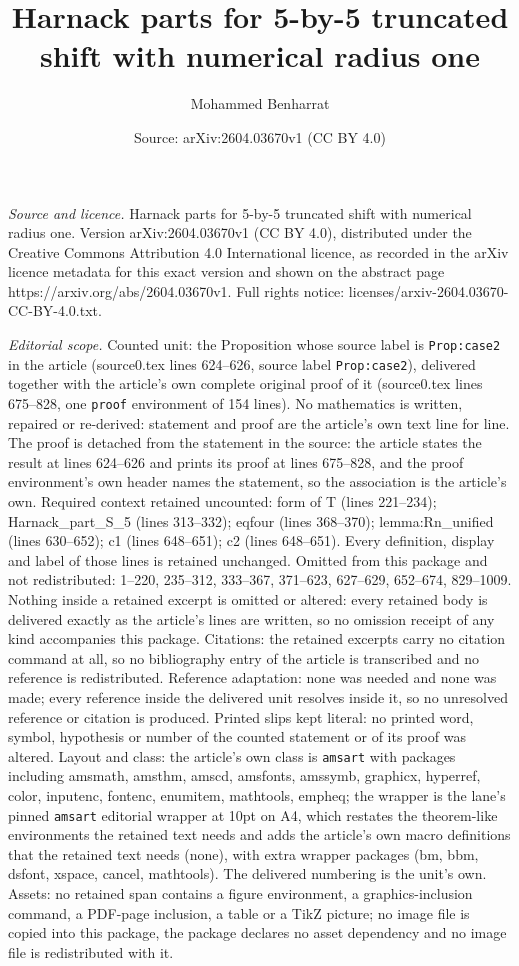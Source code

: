\documentclass[10pt,a4paper]{amsart}
\title[Harnack parts for 5-by-5 truncated shift with numerical radi]{Harnack parts for 5-by-5 truncated shift with numerical radius one}
\author{Mohammed Benharrat}
\date{Source: arXiv:2604.03670v1 (CC BY 4.0)}
\begin{document}
\maketitle

\noindent\emph{Source and licence.} Harnack parts for 5-by-5 truncated shift with numerical radius one. Version arXiv:2604.03670v1 (CC BY 4.0), distributed under the Creative Commons Attribution 4.0 International licence, as recorded in the arXiv licence metadata for this exact version and shown on the abstract page https://arxiv.org/abs/2604.03670v1. Full rights notice: licenses/arxiv-2604.03670-CC-BY-4.0.txt.\par\smallskip

\noindent\textit{Editorial scope.} Counted unit: the Proposition whose source label is \texttt{Prop:case2} in the article (source0.tex lines 624--626, source label \texttt{Prop:case2}), delivered together with the article's own complete original proof of it (source0.tex lines 675--828, one \texttt{proof} environment of 154 lines). No mathematics is written, repaired or re-derived: statement and proof are the article's own text line for line. The proof is detached from the statement in the source: the article states the result at lines 624--626 and prints its proof at lines 675--828, and the proof environment's own header names the statement, so the association is the article's own. Required context retained uncounted: form of T (lines 221--234); Harnack\_part\_S\_5 (lines 313--332); eqfour (lines 368--370); lemma:Rn\_unified (lines 630--652); c1 (lines 648--651); c2 (lines 648--651). Every definition, display and label of those lines is retained unchanged. Omitted from this package and not redistributed: 1--220, 235--312, 333--367, 371--623, 627--629, 652--674, 829--1009. Nothing inside a retained excerpt is omitted or altered: every retained body is delivered exactly as the article's lines are written, so no omission receipt of any kind accompanies this package. Citations: the retained excerpts carry no citation command at all, so no bibliography entry of the article is transcribed and no reference is redistributed. Reference adaptation: none was needed and none was made; every reference inside the delivered unit resolves inside it, so no unresolved reference or citation is produced. Printed slips kept literal: no printed word, symbol, hypothesis or number of the counted statement or of its proof was altered. Layout and class: the article's own class is \texttt{amsart} with packages including amsmath, amsthm, amscd, amsfonts, amssymb, graphicx, hyperref, color, inputenc, fontenc, enumitem, mathtools, empheq; the wrapper is the lane's pinned \texttt{amsart} editorial wrapper at 10pt on A4, which restates the theorem-like environments the retained text needs and adds the article's own macro definitions that the retained text needs (none), with extra wrapper packages (bm, bbm, dsfont, xspace, cancel, mathtools). The delivered numbering is the unit's own. Assets: no retained span contains a figure environment, a graphics-inclusion command, a PDF-page inclusion, a table or a TikZ picture; no image file is copied into this package, the package declares no asset dependency and no image file is redistributed with it. 
\end{document}
